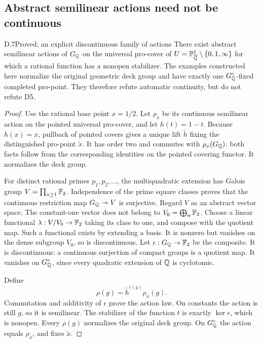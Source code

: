 \subsection{Abstract semilinear actions need not be continuous}

\begin{claim}{D.7}{Proved; an explicit discontinuous family of actions}
There exist abstract semilinear actions of $G_\mathbb Q$ on the universal
pro-cover of $U=\mathbb P^1_{\overline{\mathbb Q}}\setminus\{0,1,\infty\}$
for which a rational function has a nonopen stabilizer. The examples
constructed here normalize the original geometric deck group and
have exactly one $G_\mathbb Q^\circ$-fixed completed pro-point. They
therefore refute automatic continuity, but do not refute D5.
\end{claim}
\begin{proof}
Use the rational base point $x=1/2$. Let $\rho_x$ be its continuous
semilinear action on the pointed universal pro-cover, and let
$h(t)=1-t$. Because $h(x)=x$, pullback of pointed covers gives a
unique lift $\widetilde h$ fixing the distinguished pro-point
$\widetilde x$. It has order two and commutes with $\rho_x(G_\mathbb Q)$:
both facts follow from the corresponding identities on the
pointed covering functor. It normalizes the deck group.

For distinct rational primes $p_1,p_2,\ldots$, the multiquadratic
extension has Galois group $V=\prod_{n\geq1}\mathbb F_2$. Independence
of the prime square classes proves that the continuous restriction
map $G_\mathbb Q\twoheadrightarrow V$ is surjective. Regard $V$ as an
abstract vector space. The constant-one vector does not belong to
$V_0=\bigoplus_n\mathbb F_2$. Choose a linear functional
$\lambda:V/V_0\to\mathbb F_2$ taking its class to one, and compose
with the quotient map. Such a functional exists by extending a
basis. It is nonzero but vanishes on the dense subgroup $V_0$,
so is discontinuous. Let $\epsilon:G_\mathbb Q\to\mathbb F_2$ be the composite.
It is discontinuous: a continuous surjection of compact groups is
a quotient map. It vanishes on $G_\mathbb Q^\circ$, since every quadratic
extension of $\mathbb Q$ is cyclotomic.

Define
\[
       \rho(g)=\widetilde h^{\epsilon(g)}\rho_x(g).
\]
Commutation and additivity of $\epsilon$ prove the action law.
On constants the action is still $g$, so it is semilinear.
The stabilizer of the function $t$ is exactly $\ker\epsilon$,
which is nonopen. Every $\rho(g)$ normalizes the original deck
group. On $G_\mathbb Q^\circ$ the action equals $\rho_x$, and fixes
$\widetilde x$.


\end{proof}
